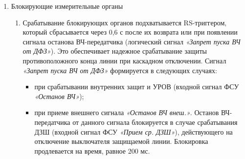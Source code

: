 \begin{enumerate}[label=\arabic{section}.\arabic{subsection}.\arabic{enumi}, labelsep=4pt, leftmargin=0pt, itemindent=57pt, itemsep=0pt, parsep=5pt]
\begin{enumerate}[label=\arabic{section}.\arabic{subsection}.\arabic{enumi}.\arabic*, labelsep=4pt, leftmargin=0em, itemindent=65pt, parsep=0pt]
\item
Разрешение на выдачу манипулированного ВЧ-сигнала (логический сигнал ФСУ \textit{«Разрешение ОМ»}) формируется от блокирующих органов, отстроенных от нагрузочного режима. 
Блокирующие органы реализованы с возможностью независимой настройки их уставок по:
\begin{itemize} 
\item линейному току (модулю разности фазных токов) \textit{«ИО Iл блок ДФЗ»};
\item приращению тока прямой последовательности \textit{«ИО dI1 блок ДФЗ»};
\item приращению тока обратной последовательности \textit{«ИО dI2 блок ДФЗ»};
\item току обратной последовательности \textit{«ИО I2 блок ДФЗ»};
\item току нулевой последовательности \textit{«ИО 3I0 блок ДФЗ»}.
\end{itemize}

\end{enumerate}


\item Блокирующие измерительные органы

\begin{enumerate}[label=\arabic{section}.\arabic{subsection}.\arabic{enumi}.\arabic*, labelsep=4pt, leftmargin=0em, itemindent=65pt, parsep=0pt]

\item
Срабатывание блокирующих органов подхватывается RS-триггером, который сбрасывается через 0,6 с после их возврата или при появлении сигнала останова ВЧ-передатчика (логический сигнал \textit{«Запрет пуска ВЧ от ДФЗ»}).
Это обеспечивает надежное срабатывание защиты противоположного конца линии при каскадном отключении. Сигнал \textit{«Запрет пуска ВЧ от ДФЗ»} формируется в следующих случаях:
\begin{itemize} 
\item при срабатывании внутренних защит и УРОВ (входной сигнал ФСУ \textit{«Останов ВЧ»});
\item при приеме внешнего сигнала \textit{«Останов ВЧ внеш.»}.
Останов ВЧ-передатчика от данного сигнала блокируется в случае срабатывания ДЗШ (входной сигнал ФСУ \textit{«Прием ср. ДЗШ»}), действующего на отключение выключателя защищаемой линии.
Блокировка продлевается на время, равное 200 мс. 
\end{itemize}


\end{enumerate}
\end{enumerate}
